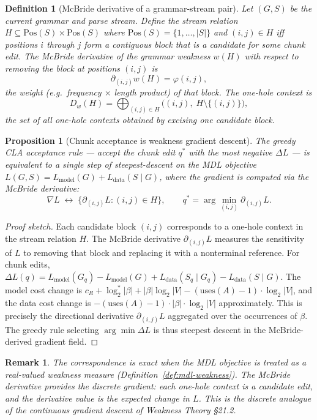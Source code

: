 \documentclass[11pt]{article}
\newtheorem{definition}{Definition}
\newtheorem{proposition}{Proposition}
\newtheorem{remark}{Remark}
\begin{document}
\begin{definition}[McBride derivative of a grammar-stream pair]
\label{def:mcbride-grammar}
Let $(G, S)$ be the current grammar and parse stream.  Define the \emph{stream relation} $H \subseteq \text{Pos}(S) \times \text{Pos}(S)$ where $\text{Pos}(S) = \{1, \ldots, |S|\}$ and $(i, j) \in H$ iff positions $i$ through $j$ form a contiguous block that is a candidate for some chunk edit.  The \emph{McBride derivative} of the grammar weakness $w(H)$ with respect to removing the block at positions $(i, j)$ is
\[
  \partial_{(i,j)} w(H) = \varphi(i, j),
\]
the weight (e.g.\ frequency $\times$ length product) of that block.  The \emph{one-hole context} is
\[
  D_w(H) = \bigoplus_{(i,j) \in H} \bigl((i,j),\; H \setminus \{(i,j)\}\bigr),
\]
the set of all one-hole contexts obtained by excising one candidate block.
\end{definition}

\begin{proposition}[Chunk acceptance is weakness gradient descent]
\label{prop:chunk-gradient}
The greedy CLA acceptance rule --- accept the chunk edit $q^*$ with the most negative $\Delta L$ --- is equivalent to a single step of steepest-descent on the MDL objective $L(G, S) = L_{\text{model}}(G) + L_{\text{data}}(S \mid G)$, where the gradient is computed via the McBride derivative:
\[
  \nabla L \;\leftrightarrow\; \bigl\{ \partial_{(i,j)} L : (i,j) \in H \bigr\}, \qquad q^* = \arg\min_{(i,j)} \partial_{(i,j)} L.
\]
\end{proposition}

\begin{proof}[Proof sketch]
Each candidate block $(i,j)$ corresponds to a one-hole context in the stream relation $H$.  The McBride derivative $\partial_{(i,j)} L$ measures the sensitivity of $L$ to removing that block and replacing it with a nonterminal reference.  For chunk edits, $\Delta L(q) = L_{\text{model}}(G_q) - L_{\text{model}}(G) + L_{\text{data}}(S_q \mid G_q) - L_{\text{data}}(S \mid G)$.  The model cost change is $c_R + \log_2^* |\beta| + |\beta| \log_2 |V| - (\text{uses}(A) - 1) \cdot \log_2 |V|$, and the data cost change is $-(\text{uses}(A) - 1) \cdot |\beta| \cdot \log_2 |V|$ approximately.  This is precisely the directional derivative $\partial_{(i,j)} L$ aggregated over the occurrences of $\beta$.  The greedy rule selecting $\arg\min \Delta L$ is thus steepest descent in the McBride-derived gradient field.
\end{proof}

\begin{remark}
The correspondence is exact when the MDL objective is treated as a real-valued weakness measure (Definition~\ref{def:mdl-weakness}).  The McBride derivative provides the \emph{discrete} gradient: each one-hole context is a candidate edit, and the derivative value is the expected change in $L$.  This is the discrete analogue of the continuous gradient descent of Weakness Theory \S 21.2.
\end{remark}
\end{document}
